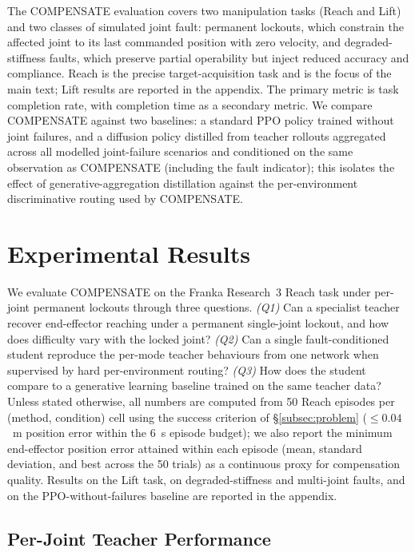 \documentclass{article}
\begin{document}
The COMPENSATE evaluation covers two manipulation tasks (Reach and Lift) and two classes of simulated joint fault: permanent lockouts, which constrain the affected joint to its last commanded position with zero velocity, and degraded-stiffness faults, which preserve partial operability but inject reduced accuracy and compliance. Reach is the precise target-acquisition task and is the focus of the main text; Lift results are reported in the appendix. The primary metric is task completion rate, with completion time as a secondary metric. We compare COMPENSATE against two baselines: a standard PPO policy trained without joint failures, and a diffusion policy distilled from teacher rollouts aggregated across all modelled joint-failure scenarios and conditioned on the same observation as COMPENSATE (including the fault indicator); this isolates the effect of generative-aggregation distillation against the per-environment discriminative routing used by COMPENSATE.



\section{Experimental Results}
\label{sec:result}

	We evaluate COMPENSATE on the Franka Research~3 Reach task under per-joint permanent lockouts
	through three questions. \emph{(Q1)} Can a specialist teacher recover end-effector reaching
	under a permanent single-joint lockout, and how does difficulty vary with the locked joint?
	\emph{(Q2)} Can a single fault-conditioned student reproduce the per-mode teacher behaviours
	from one network when supervised by hard per-environment routing? \emph{(Q3)} How does the
	student compare to a generative learning baseline trained on the same teacher data? Unless
	stated otherwise, all numbers are computed from 50 Reach episodes per (method, condition) cell
	using the success criterion of \S\ref{subsec:problem} ($\le 0.04$~m position error within the
	6~s episode budget); we also report the minimum end-effector position error attained within
	each episode (mean, standard deviation, and best across the 50 trials) as a continuous proxy
	for compensation quality. Results on the Lift task, on degraded-stiffness and multi-joint
	faults, and on the PPO-without-failures baseline are reported in the appendix.

	\subsection{Per-Joint Teacher Performance}
	\label{subsec:results-teacher}
\end{document}
